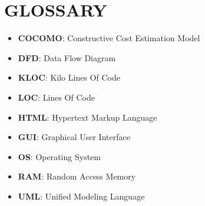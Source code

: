 \documentclass[12pt,a4paper,oneside]{report}
\begin{document}
\chapter*{GLOSSARY}
\begin{itemize}
\item\textbf{ COCOMO}: Constructive Cost Estimation Model
\item\textbf{ DFD}: Data Flow Diagram
\item\textbf{ KLOC}: Kilo Lines Of Code
\item\textbf{ LOC}: Lines Of Code
\item\textbf{ HTML}: Hypertext Markup Language
\item\textbf{ GUI}: Graphical User Interface
\item\textbf{ OS}: Operating System
\item\textbf{ RAM}: Random Access Memory
\item\textbf{ UML}: Unified Modeling Language
\end{itemize}
\newpage
{}
\end{document}
